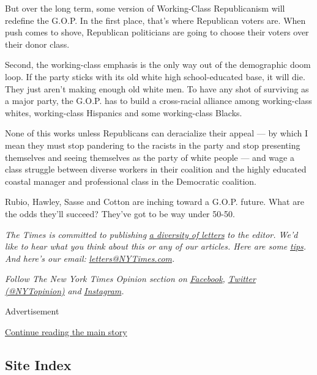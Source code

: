 But over the long term, some version of Working-Class Republicanism will
redefine the G.O.P. In the first place, that's where Republican voters
are. When push comes to shove, Republican politicians are going to
choose their voters over their donor class.

Second, the working-class emphasis is the only way out of the
demographic doom loop. If the party sticks with its old white high
school-educated base, it will die. They just aren't making enough old
white men. To have any shot of surviving as a major party, the G.O.P.
has to build a cross-racial alliance among working-class whites,
working-class Hispanics and some working-class Blacks.

None of this works unless Republicans can deracialize their appeal ---
by which I mean they must stop pandering to the racists in the party and
stop presenting themselves and seeing themselves as the party of white
people --- and wage a class struggle between diverse workers in their
coalition and the highly educated coastal manager and professional class
in the Democratic coalition.

Rubio, Hawley, Sasse and Cotton are inching toward a G.O.P. future. What
are the odds they'll succeed? They've got to be way under 50-50.

\emph{The Times is committed to publishing}
\href{https://www.nytimes3xbfgragh.onion/2019/01/31/opinion/letters/letters-to-editor-new-york-times-women.html}{\emph{a
diversity of letters}} \emph{to the editor. We'd like to hear what you
think about this or any of our articles. Here are some}
\href{https://help.nytimes3xbfgragh.onion/hc/en-us/articles/115014925288-How-to-submit-a-letter-to-the-editor}{\emph{tips}}\emph{.
And here's our email:}
\href{mailto:letters@NYTimes.com}{\emph{letters@NYTimes.com}}\emph{.}

\emph{Follow The New York Times Opinion section on}
\href{https://www.facebookcorewwwi.onion/nytopinion}{\emph{Facebook}}\emph{,}
\href{http://twitter.com/NYTOpinion}{\emph{Twitter (@NYTopinion)}}
\emph{and}
\href{https://www.instagram.com/nytopinion/}{\emph{Instagram}}\emph{.}

Advertisement

\protect\hyperlink{after-bottom}{Continue reading the main story}

\hypertarget{site-index}{%
\subsection{Site Index}\label{site-index}}

